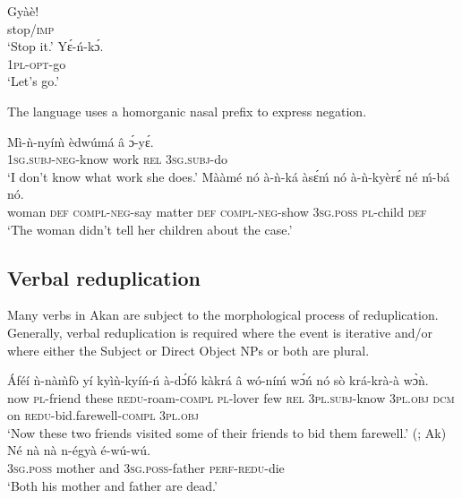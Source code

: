 \documentclass[output=paper]{langsci/langscibook}
\begin{document}
\ea\label{ex:11.osam}
\ea\label{ex:11a.osam}
\gll Gyàè!\\
       stop/\textsc{imp}\\
\glt   `Stop it.'
\ex\label{ex:11b.osam}
\gll  Yɛ́-ń-kɔ́.\\
       \textsc{1pl}-\textsc{opt}-go\\
\glt   `Let's go.'
\z 
\z 

The language uses a homorganic nasal prefix to express negation.

\ea\label{ex:12.osam}
\ea\label{ex:12a.osam}
\gll  Mì-ǹ-nyí\`{m}     èdwúmá  â   ɔ́-yɛ́.\\
       \textsc{1sg.subj}-\textsc{neg}-know  work    \textsc{rel}  \textsc{3sg.subj}-do\\
\glt   `I don't know what work she does.'
\ex\label{ex:12b.osam}
\gll   Mààmé    nó  à-ǹ-ká       àsɛ́ḿ  nó  à-ǹ-kyèrɛ́ né    ḿ-bá    nó.\\
       woman    \textsc{def}  \textsc{compl}-\textsc{neg}-say  matter  \textsc{def}  \textsc{compl}-\textsc{neg}-show    \textsc{3sg.poss}  \textsc{pl}-child  \textsc{def}\\
\glt   `The woman didn't tell her children about the case.'  
\z 
\z 

\subsection{Verbal reduplication}\label{§2.2:verbalreduplicaion.osam}

Many verbs in Akan are subject to the morphological process of reduplication. Generally, verbal reduplication is required where the event is iterative and/or where either the Subject or Direct Object NPs or both are plural.

\ea\label{ex:13.osam}
\ea\label{ex:13a.osam}
\gll   Áféí  ǹ-nà\`{m}fò   yí   kyìǹ-kyíń-ń     à-dɔ́fó     kàkrá â  wó-níḿ     wɔ́ń     nó   sò krá-krà-à       wɔ̀ǹ.\\
       now  \textsc{pl}-friend  these  \textsc{redu}-roam-\textsc{compl}  \textsc{pl}-lover  few \textsc{rel}  \textsc{3pl.subj}-know  \textsc{3pl.obj}  \textsc{dcm}  on \textsc{redu}-bid.farewell-\textsc{compl}  \textsc{3pl.obj}\\
\glt   `Now these two friends visited some of their friends to bid them farewell.' (\citealt[41]{adi1973}; Ak)
\ex\label{ex:13b.osam}
\gll   Né    nà    nà  n-égyà      é-wú-wú.\\
       \textsc{3sg.poss}  mother    and  \textsc{3sg.poss}-father  \textsc{perf-redu}-die\\
\glt   `Both his mother and father are dead.' \citep[24]{martin1936}
\z 
\z 
\end{document}
